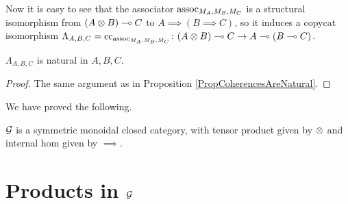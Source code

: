 \documentclass[11pt]{report}
\begin{document}
Now it is easy to see that the associator $\operatorname{assoc}_{M_A,M_B,M_C}$ is a structural isomorphism from $(A\otimes B) \multimap C$ to $A\implies (B\implies C)$, so it induces a copycat isomorphism $\Lambda_{A,B,C}=\operatorname{cc}_{\operatorname{assoc}_{M_A,M_B,M_C}} \colon (A\otimes B) \multimap C \to A \multimap (B\multimap C)$.

\begin{proposition}
  $\Lambda_{A,B,C}$ is natural in $A,B,C$.
\end{proposition}
\begin{proof}
  The same argument as in Proposition \ref{PropCoherencesAreNatural}.
\end{proof}

We have proved the following.

\begin{theorem}
  $\mathcal G$ is a symmetric monoidal closed category, with tensor product given by $\otimes$ and internal hom given by $\implies$.
\end{theorem}

\section{Products in $\mathcal G$}
\end{document}
